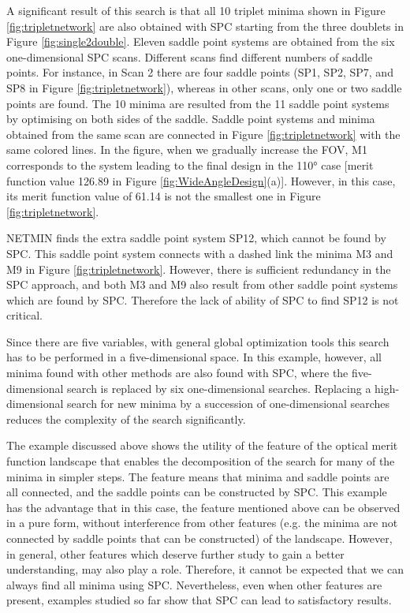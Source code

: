 
A significant result of this search is that all 10 triplet minima shown in Figure \ref{fig:tripletnetwork} are also obtained with SPC starting from the three doublets in Figure \ref{fig:single2double}. Eleven saddle point systems are obtained from the six one-dimensional SPC scans. Different scans find different numbers of saddle points. For instance, in Scan 2 there are four saddle points (SP1, SP2, SP7, and SP8 in Figure \ref{fig:tripletnetwork}), whereas in other scans, only one or two saddle points are found. The 10 minima are resulted from the 11 saddle point systems by optimising on both sides of the saddle. Saddle point systems and minima obtained from the same scan are connected in Figure \ref{fig:tripletnetwork} with the same colored lines. In the figure, when we gradually increase the FOV, M1 corresponds to the system leading to the final design in the 110° case [merit function value 126.89 in Figure \ref{fig:WideAngleDesign}(a)]. However, in this case, its merit function value of 61.14 is not the smallest one in Figure \ref{fig:tripletnetwork}.

NETMIN finds the extra saddle point system SP12, which cannot be found by SPC. This saddle point system connects with a dashed link the minima M3 and M9 in Figure \ref{fig:tripletnetwork}. However, there is sufficient redundancy in the SPC approach, and both M3 and M9 also result from other saddle point systems which are found by SPC. Therefore the lack of ability of SPC to find SP12 is not critical.

Since there are five variables, with general global optimization tools this search has to be performed in a five-dimensional space. In this example, however, all minima found with other methods are also found with SPC, where the five-dimensional search is replaced by six one-dimensional searches. Replacing a high-dimensional search for new minima by a succession of one-dimensional searches reduces the complexity of the search significantly.

The example discussed above shows the utility of the feature of the optical merit function landscape that enables the decomposition of the search for many of the minima in simpler steps. The feature means that minima and saddle points are all connected, and the saddle points can be constructed by SPC. This example has the advantage that in this case, the feature mentioned above can be observed in a pure form, without interference from other features (e.g. the minima are not connected by saddle points that can be constructed) of the landscape. However, in general, other features which deserve further study to gain a better understanding, may also play a role. Therefore, it cannot be expected that we can always find all minima using SPC. Nevertheless, even when other features are present, examples studied so far show that SPC can lead to satisfactory results.

